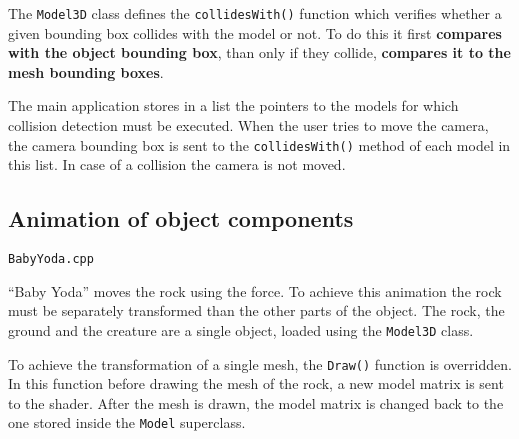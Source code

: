 The \verb|Model3D| class defines the \verb|collidesWith()| function which verifies whether a given bounding box collides with the model or not. To do this it first \textbf{compares with the object bounding box}, than only if they collide, \textbf{compares it to the mesh bounding boxes}.

The main application stores in a list the pointers to the models for which collision detection must be executed. When the user tries to move the camera, the camera bounding box is  
sent to the \verb|collidesWith()| method of each model in this list. In case of a collision the camera is not moved.





\subsection{Animation of object components}

\verb|BabyYoda.cpp|

``Baby Yoda'' moves the rock using the force. To achieve this animation the rock must be separately transformed than the other parts of the object. The rock, the ground and the creature are a single object, loaded using the \verb|Model3D| class.

To achieve the transformation of a single mesh, the \verb|Draw()| function is overridden. In this function before drawing the mesh of the rock, a new model matrix is sent to the shader. After the mesh is drawn, the model matrix is changed back to the one stored inside the \verb|Model| superclass.
